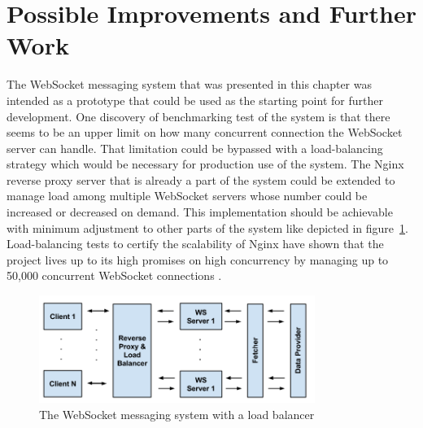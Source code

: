 \section{Possible Improvements and Further Work}

The WebSocket messaging system that was presented in this chapter was intended as a prototype that could be used as the starting point for further development. One discovery of benchmarking test of the system is that there seems to be an upper limit on how many concurrent connection the WebSocket server can handle. That limitation could be bypassed with a load-balancing strategy which would be necessary for production use of the system. The Nginx reverse proxy server that is already a part of the system could be extended to manage load among multiple WebSocket servers whose number could be increased or decreased on demand. This implementation should be achievable with minimum adjustment to other parts of the system like depicted in figure~\ref{fig:websocketMessagingSystemLoadBalancer}. Load-balancing tests to certify the scalability of Nginx have shown that the project lives up to its high promises on high concurrency by managing up to 50,000 concurrent WebSocket connections \cite{nginxWebsocket}.
\\
\begin{figure}[h!]
	\centering
	\includegraphics[width=0.8\textwidth]{images/websocketMessagingSystemLoadBalancer}
	\caption{The WebSocket messaging system with a load balancer}
	\label{fig:websocketMessagingSystemLoadBalancer}
\end{figure}

